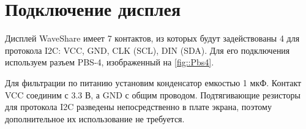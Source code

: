 \section {Подключение дисплея}

Дисплей WaveShare имеет 7 контактов, из которых будут задействованы 4 для протокола I2C: VCC, GND, CLK (SCL), DIN (SDA). Для его подключения используем разъем PBS-4, изображенный на \ref{fig::Pbs4}. 


Для фильтрации по питанию установим конденсатор емкостью 1 мкФ. Контакт VCC соединим с 3.3 В, а GND с общим проводом. Подтягивающие резисторы для протокола I2C разведены непосредственно в плате экрана, поэтому дополнительное их использование не требуется.